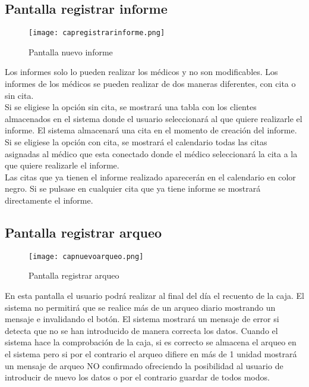 \newpage
\subsection{Pantalla registrar informe}
\begin{figure}[!htb]
  \centering
    \texttt{[image: capregistrarinforme.png]}
  \caption{Pantalla nuevo informe}
  \label{a}
\end{figure}

Los informes solo lo pueden realizar los médicos y no son modificables. Los informes de los médicos se pueden realizar de dos maneras diferentes, con cita o sin cita.\\
 Si se eligiese la opción sin cita, se mostrará una tabla con los clientes almacenados en el sistema donde el usuario seleccionará al que quiere realizarle el informe. El sistema almacenará una cita en el momento de creación del informe.\\
Si se eligiese la opción con cita, se mostrará el calendario todas las citas asignadas al médico que esta conectado donde el médico seleccionará la cita a la que quiere realizarle el informe.\\

Las citas que ya tienen el informe realizado aparecerán en el calendario en color negro. Si se pulsase en cualquier cita que ya tiene informe se mostrará directamente el informe.

\newpage
\subsection {Pantalla registrar arqueo}

\begin{figure}[!htb]
  \centering
    \texttt{[image: capnuevoarqueo.png]}
  \caption{Pantalla registrar arqueo}
  \label{a}
\end{figure}

En esta pantalla el usuario podrá realizar al final del día el recuento de la caja. El sistema no permitirá que se realice más de un arqueo diario mostrando un mensaje e invalidando el botón. El sistema mostrará un mensaje de error si detecta que no se han introducido de manera correcta los datos. Cuando el sistema hace la comprobación de la caja, si es correcto se almacena el arqueo en el sistema pero si por el contrario el arqueo difiere en más de 1 unidad mostrará un mensaje de arqueo NO confirmado ofreciendo la posibilidad al usuario de introducir de nuevo los datos o por el contrario guardar de todos modos.

